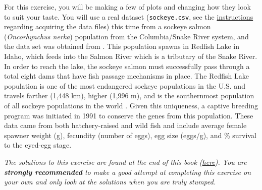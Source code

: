 \documentclass[]{book}
\theoremstyle{definition}
\theoremstyle{definition}
\theoremstyle{definition}
\theoremstyle{remark}
\begin{document}
For this exercise, you will be making a few of plots and changing how
they look to suit your taste. You will use a real dataset
(\texttt{sockeye.csv}, see the
\protect\hyperlink{data-sets}{instructions} regarding acquiring the data
files) this time from a sockeye salmon (\emph{Oncorhynchus nerka})
population from the Columbia/Snake River system, and the data set was
obtained from \citet{sockeye-cite}. This population spawns in Redfish
Lake in Idaho, which feeds into the Salmon River which is a tributary of
the Snake River. In order to reach the lake, the sockeye salmon must
successfully pass through a total eight dams that have fish passage
mechanisms in place. The Redfish Lake population is one of the most
endangered sockeye populations in the U.S. and travels farther (1,448
km), higher (1,996 m), and is the southernmost population of all sockeye
populations in the world \citep{sockeye-cite}. Given this uniqueness, a
captive breeding program was initiated in 1991 to conserve the genes
from this population. These data came from both hatchery-raised and wild
fish and include average female spawner weight (g), fecundity (number of
eggs), egg size (eggs/g), and \% survival to the eyed-egg stage.

\emph{The solutions to this exercise are found at the end of this book
(\protect\hyperlink{ex2-answers}{here}). You are \textbf{strongly
recommended} to make a good attempt at completing this exercise on your
own and only look at the solutions when you are truly stumped.}
\end{document}
